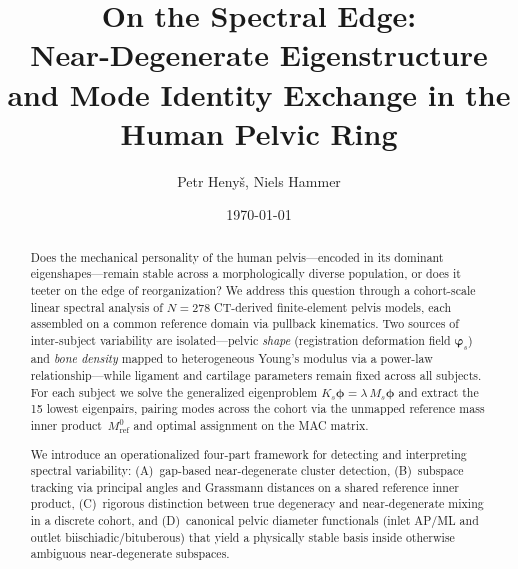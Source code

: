 \documentclass[11pt]{article}
\title{On the Spectral Edge:\\ Near-Degenerate Eigenstructure and Mode Identity Exchange in the Human Pelvic Ring}
\author{Petr Heny\v{s}, Niels Hammer}
\date{\today}
\begin{document}
\maketitle

\begin{abstract}
Does the mechanical personality of the human pelvis---encoded in its dominant eigenshapes---remain stable across a morphologically diverse population, or does it teeter on the edge of reorganization?
We address this question through a cohort-scale linear spectral analysis of $N{=}278$ CT-derived finite-element pelvis models, each assembled on a common reference domain via pullback kinematics.
Two sources of inter-subject variability are isolated---pelvic \emph{shape} (registration deformation field $\boldsymbol\varphi_s$) and \emph{bone density} mapped to heterogeneous Young's modulus via a power-law relationship---while ligament and cartilage parameters remain fixed across all subjects.
For each subject we solve the generalized eigenproblem $K_s\boldsymbol\phi = \lambda\,M_s\boldsymbol\phi$ and extract the 15 lowest eigenpairs, pairing modes across the cohort via the unmapped reference mass inner product~$M_{\mathrm{ref}}^{0}$ and optimal assignment on the MAC matrix.

We introduce an operationalized four-part framework for detecting and interpreting spectral variability:
(A)~gap-based near-degenerate cluster detection,
(B)~subspace tracking via principal angles and Grassmann distances on a shared reference inner product,
(C)~rigorous distinction between true degeneracy and near-degenerate mixing in a discrete cohort, and
(D)~canonical pelvic diameter functionals (inlet AP/ML and outlet biischiadic/bituberous) that yield a physically stable basis inside otherwise ambiguous near-degenerate subspaces.


\end{abstract}
\end{document}
